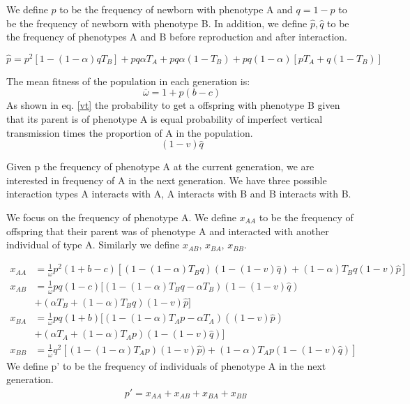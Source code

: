 \documentclass{article}
\begin{document}
We define $p$ to be the frequency of newborn with phenotype A and $q=1-p$ to be the frequency of newborn with phenotype B. In addition, we define $\hat{p},\hat{q}$ to be the frequency of phenotypes A and B before reproduction and after interaction.

\begin{equation} \label{d}
\hat{p} = p^2\left[1-\left(1-\alpha\right)qT_B\right] + pq\alpha T_A + pq\alpha(1-T_B) + pq(1-\alpha)[pT_A+q(1-T_B)]
\end{equation}

The mean fitness of the population in each generation is:
\begin{equation} \label{d}
\overline{\omega} = 1 + p(b-c)
\end{equation}
As shown in eq. \eqref{vt} the probability to get a offspring with phenotype B given that its parent is of phenotype A is equal probability of imperfect vertical transmission times the proportion of A in the population. 
\begin{equation} \label{vt}
(1-v)\hat{q}
\end{equation}

Given p the frequency of phenotype A at the current generation, we are interested in frequency of A in the next generation. We have three possible interaction types A interacts with A, A interacts with B and B interacts with B.


We focus on the frequency of phenotype A. We define $x_{AA}$ to be the frequency of offspring that their parent was of phenotype A and interacted with another individual of type A. Similarly we define $x_{AB}, \, x_{BA}, \, x_{BB}$.

\begin{equation} 
\begin{split}\label{aim1model0}
 x_{AA} &= \frac{1}{\overline{\omega}}p^2(1+b-c)[(1-(1-\alpha)T_Bq)(1-(1-v)\hat{q})+(1-\alpha)T_Bq(1-v)\hat{p}]\\
 x_{AB} &= \frac{1}{\overline{\omega}}pq(1-c)[(1-(1-\alpha)T_Bq-\alpha T_B)(1-(1-v)\hat{q}) \\ &+ (\alpha T_B+(1-\alpha)T_Bq)(1-v)\hat{p}]\\
 x_{BA} &= \frac{1}{\overline{\omega}}pq(1+b)[(1-(1-\alpha)T_Ap-\alpha T_A)((1-v)\hat{p})\\ & +(\alpha T_A+(1-\alpha)T_A p)(1-(1-v)\hat{q})] \\
 x_{BB} &= \frac{1}{\overline{\omega}}q^2[(1-(1-\alpha)T_Ap)(1-v)\hat{p})+(1-\alpha)T_Ap(1-(1-v)\hat{q})]
\end{split}
\end{equation}
We define p' to be the frequency of individuals of phenotype A in the next generation.
\begin{equation} 
\begin{split}\label{aim1model}
& p' = x_{AA} + x_{AB} + x_{BA} + x_{BB}
\end{split}
\end{equation}
\end{document}
